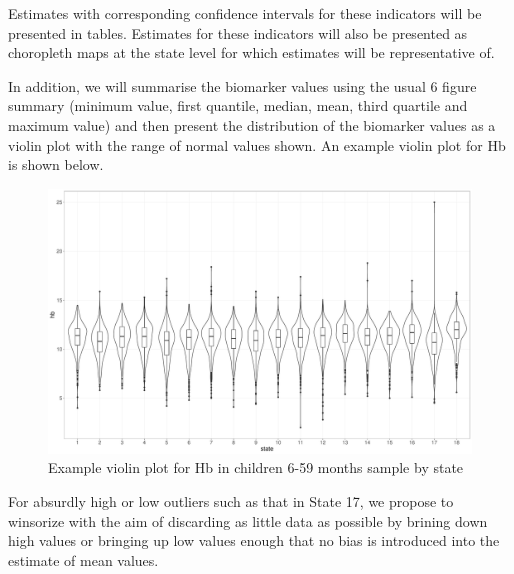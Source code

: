 \documentclass[12pt,a4paper]{article}
\begin{document}
Estimates with corresponding confidence intervals for these indicators will be presented in tables. Estimates for these indicators will also be presented as choropleth maps at the state level for which estimates will be representative of.

In addition, we will summarise the biomarker values using the usual 6 figure summary (minimum value, first quantile, median, mean, third quartile and maximum value) and then present the distribution of the biomarker values as a violin plot with the range of normal values shown. An example violin plot for Hb is shown below.

\begin{figure}[H]

{\centering \includegraphics{sudanMNindicators_files/figure-latex/violin-1} 

}

\caption{Example violin plot for Hb in children 6-59 months sample by state}\label{fig:violin}
\end{figure}

For absurdly high or low outliers such as that in State 17, we propose to winsorize with the aim of discarding as little data as possible by brining down high values or bringing up low values enough that no bias is introduced into the estimate of mean values.

\newpage

\renewcommand\refname{References}

\end{document}
